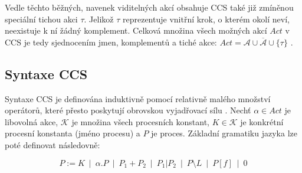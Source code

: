 Vedle těchto běžných, navenek viditelných akcí obsahuje CCS také již zmíněnou speciální tichou akci $\tau$. 
Jelikož $\tau$ reprezentuje vnitřní krok, o kterém okolí neví, neexistuje k ní žádný komplement.
Celková množina všech možných akcí $Act$ v CCS je tedy sjednocením jmen, komplementů a tiché akce: $Act = \mathcal{A} \cup \overline{\mathcal{A}} \cup \{\tau\}$ \cite{aceto2007reactive}.

\subsection{Syntaxe CCS}
\label{sec:ccs_syntax}
Syntaxe CCS je definována induktivně pomocí relativně malého množství operátorů, které přesto poskytují obrovskou vyjadřovací sílu \cite{aceto2007reactive}. 
Nechť $\alpha \in Act$ je libovolná akce, $\mathcal{K}$ je množina všech procesních konstant, $K \in \mathcal{K}$ je konkrétní procesní konstanta (jméno procesu) a $P$ je proces. 
Základní gramatiku jazyka lze poté definovat následovně:

\[ P := K\ \mid\ \alpha.P\ \mid\ P_{1} + P_{2}\ \mid\ P_{1}|P_{2}\ \mid\ P \setminus L\ \mid\ P[f]\ \mid\ 0 \]

